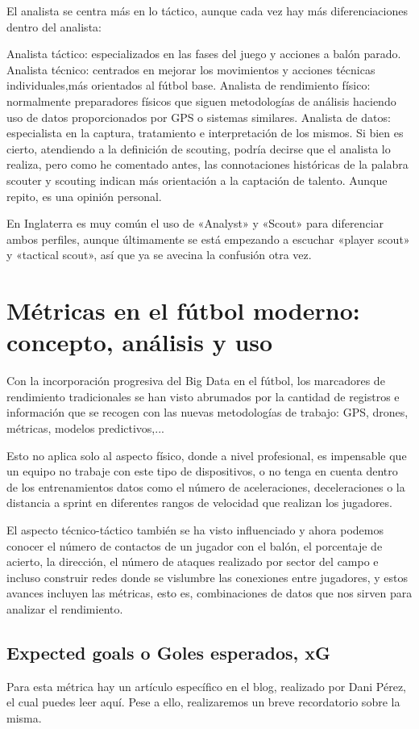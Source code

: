 El analista se centra más en lo táctico, aunque cada vez hay 
más diferenciaciones dentro del analista:

Analista táctico: especializados en las fases del juego y acciones 
a balón parado.
Analista técnico: centrados en mejorar los movimientos y acciones 
técnicas individuales,más orientados al fútbol base.
Analista de rendimiento físico: normalmente preparadores físicos 
que siguen metodologías de análisis haciendo uso de datos 
proporcionados por GPS o sistemas similares.
Analista de datos: especialista en la captura, tratamiento e 
interpretación de los mismos.
Si bien es cierto, atendiendo a la definición de scouting, 
podría decirse que el analista lo realiza, pero como he 
comentado antes, las connotaciones históricas de la palabra 
scouter y scouting indican más orientación a la captación de 
talento. Aunque repito, es una opinión personal.

En Inglaterra es muy común el uso de «Analyst» y «Scout» 
para diferenciar ambos perfiles, aunque últimamente se está 
empezando a escuchar «player scout» y «tactical scout», así 
que ya se avecina la confusión otra vez.

\section{Métricas en el fútbol moderno: concepto, análisis y uso}
Con la incorporación progresiva del Big Data en el fútbol, 
los marcadores de rendimiento tradicionales se han visto 
abrumados por la cantidad de registros e información que 
se recogen con las nuevas metodologías de trabajo: GPS, drones, 
métricas, modelos predictivos,...

Esto no aplica solo al aspecto físico, donde a nivel profesional, 
es impensable que un equipo no trabaje con este tipo de dispositivos, 
o no tenga en cuenta dentro de los entrenamientos datos como el 
número de aceleraciones, deceleraciones o la distancia a sprint 
en diferentes rangos de velocidad que realizan los jugadores.

El aspecto técnico-táctico también se ha visto influenciado y 
ahora podemos conocer el número de contactos de un jugador con 
el balón, el porcentaje de acierto, la dirección, el número de 
ataques realizado por sector del campo e incluso construir 
redes donde se vislumbre las conexiones entre jugadores, y 
estos avances incluyen las métricas, esto es, combinaciones de datos 
que nos sirven para analizar el rendimiento.

\subsection{Expected goals o Goles esperados, xG}
Para esta métrica hay un artículo específico en el blog, realizado 
por Dani Pérez, el cual puedes leer aquí. Pese a ello, realizaremos 
un breve recordatorio sobre la misma.

